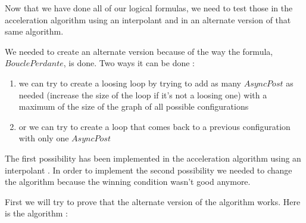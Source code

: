 \documentclass{article}
\begin{document}
Now that we have done all of our logical formulas, we need to test those in the acceleration algorithm using an interpolant \cite{algo} and in an alternate version of that same algorithm.

We needed to create an alternate version because of the way the formula, $BouclePerdante$, is done. Two ways it can be done :
\begin{enumerate}
    \item we can try to create a loosing loop by trying to add as many $AsyncPost$ as needed (increase the size of the loop if it's not a loosing one) with a maximum of the size of the graph of all possible configurations
    \item or we can try to create a loop that comes back to a previous configuration with only one $AsyncPost$
\end{enumerate}

The first possibility has been implemented in the acceleration algorithm using an interpolant \cite{algo}. In order to implement the second possibility we needed to change the algorithm because the winning condition wasn't good anymore.

First we will try to prove that the alternate version of the algorithm works.
Here is the algorithm :

\begin{algorithm}
\end{algorithm}
\newpage
\end{document}
